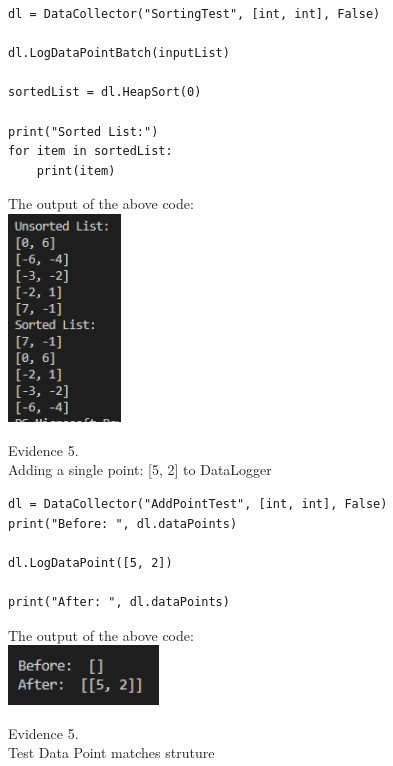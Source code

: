 \begin{flushleft}
\begin{center}
\begin{verbatim}
dl = DataCollector("SortingTest", [int, int], False)

dl.LogDataPointBatch(inputList)

sortedList = dl.HeapSort(0)

print("Sorted List:")
for item in sortedList:
    print(item)
        \end{verbatim}

        The output of the above code: \\
        \includegraphics[width=3cm]{Images/Testing/T4.1.1.PNG} \\

        \vspace{1cm}

        {\large Evidence 5.\rn } \\ 
        \vspace{0.3cm}
        Adding a single point: [5, 2] to DataLogger \\
        \begin{verbatim}
dl = DataCollector("AddPointTest", [int, int], False)
print("Before: ", dl.dataPoints)

dl.LogDataPoint([5, 2])

print("After: ", dl.dataPoints)
        \end{verbatim}

        The output of the above code: \\
        \includegraphics[width=4cm]{Images/Testing/T4.2.1.PNG} \\
        \vspace{1cm}

        {\large Evidence 5.\rn } \\ 
        \vspace{0.3cm}
        Test Data Point matches struture \\


\end{center}
\end{flushleft}
